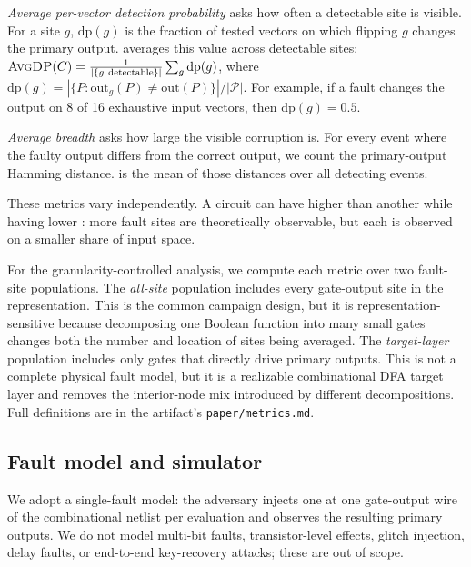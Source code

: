\textit{Average per-vector detection probability} \AvgDP{} asks how
often a detectable site is visible. For a site $g$, $\text{dp}(g)$ is
the fraction of tested vectors on which flipping $g$ changes the
primary output. \AvgDP{} averages this value across detectable sites:
$\textsc{AvgDP}(C) = \frac{1}{|\{g~\text{detectable}\}|} \sum_g \text{dp}(g)$,
where $\text{dp}(g) = |\{P : \text{out}_g(P) \ne \text{out}(P)\}| / |\mathcal{P}|$.
For example, if a fault changes the output on 8 of 16 exhaustive input
vectors, then $\text{dp}(g)=0.5$.

\textit{Average breadth} \AvgBW{} asks how large the visible corruption
is. For every event where the faulty output differs from the correct
output, we count the primary-output Hamming distance. \AvgBW{} is the
mean of those distances over all detecting events.

These metrics vary independently. A circuit can have higher \FCpct{}
than another while having lower \AvgDP{}: more fault sites are
theoretically observable, but each is observed on a smaller share of
input space.

For the granularity-controlled analysis, we compute each metric over two
fault-site populations. The \emph{all-site} population includes every
gate-output site in the representation. This is the common campaign
design, but it is representation-sensitive because decomposing one
Boolean function into many small gates changes both the number and
location of sites being averaged. The \emph{target-layer} population
includes only gates that directly drive primary outputs. This is not a
complete physical fault model, but it is a realizable combinational DFA
target layer and removes the interior-node mix introduced by different
decompositions. Full definitions are in the artifact's
\texttt{paper/metrics.md}.

\subsection{Fault model and simulator}
\label{sec:methodology:simulator}

We adopt a single-fault model: the adversary injects one
\bitflip{} at one gate-output wire of the combinational netlist per
evaluation and observes the resulting primary outputs. We do not
model multi-bit faults, transistor-level effects, glitch injection,
delay faults, or end-to-end key-recovery attacks; these are
out of scope.

